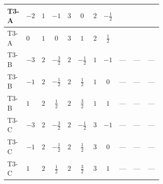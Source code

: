 \documentclass[8pt]{article}
\begin{document}
\begin{landscape}
\begin{longtable}{@{}llcccccc >{\raggedright\arraybackslash}p{0.21\linewidth} >{\raggedright\arraybackslash}p{0.21\linewidth} >{\raggedright\arraybackslash}p{0.21\linewidth}@{}}
\midrule
T3-A & $-2$ & $1$ & $-1$ & $3$ & $0$ & $2$ & $-\frac{1}{2}$ & \scriptsize\adjustbox{max width=\linewidth}{$\begin{gathered} {\lambda_5} (2 T_{\nu}^{(1)}+T_{\nu}^{(2)}+6 \operatorname{Tr}\!\left({Y_d}\,\left({Y_d}\right)^{\dagger}\right)+2 \operatorname{Tr}\!\left({Y_e}\,\left({Y_e}\right)^{\dagger}\right)+6 \operatorname{Tr}\!\left({Y_u}\,\left({Y_u}\right)^{\dagger}\right)+4 {\lambda_{HS_2}^{(A)}})\end{gathered}$} & \scriptsize\adjustbox{max width=\linewidth}{$\begin{gathered} -\frac{21 {g_2}^2 {\lambda_5}}{2}\end{gathered}$} & \scriptsize\adjustbox{max width=\linewidth}{$\begin{gathered} -\frac{9 {g_1}^2 {\lambda_5}}{2}\end{gathered}$} \\
\midrule
T3-A & $0$ & $1$ & $0$ & $3$ & $1$ & $2$ & $\frac{1}{2}$ & \scriptsize\adjustbox{max width=\linewidth}{$\begin{gathered} {\lambda_5} (2 T_{\nu}^{(1)}+T_{\nu}^{(2)}+6 \operatorname{Tr}\!\left({Y_d}\,\left({Y_d}\right)^{\dagger}\right)+2 \operatorname{Tr}\!\left({Y_e}\,\left({Y_e}\right)^{\dagger}\right)+6 \operatorname{Tr}\!\left({Y_u}\,\left({Y_u}\right)^{\dagger}\right)+4 {\lambda_{HS_2}^{(A)}})\end{gathered}$} & \scriptsize\adjustbox{max width=\linewidth}{$\begin{gathered} -\frac{21 {g_2}^2 {\lambda_5}}{2}\end{gathered}$} & \scriptsize\adjustbox{max width=\linewidth}{$\begin{gathered} -\frac{9 {g_1}^2 {\lambda_5}}{2}\end{gathered}$} \\
\midrule
T3-B & $-3$ & $2$ & $-\frac{3}{2}$ & $2$ & $-\frac{1}{2}$ & $1$ & $-1$ & --- & --- & --- \\
\midrule
T3-B & $-1$ & $2$ & $-\frac{1}{2}$ & $2$ & $\frac{1}{2}$ & $1$ & $0$ & --- & --- & --- \\
\midrule
T3-B & $1$ & $2$ & $\frac{1}{2}$ & $2$ & $\frac{3}{2}$ & $1$ & $1$ & --- & --- & --- \\
\midrule
T3-C & $-3$ & $2$ & $-\frac{3}{2}$ & $2$ & $-\frac{1}{2}$ & $3$ & $-1$ & --- & --- & --- \\
\midrule
T3-C & $-1$ & $2$ & $-\frac{1}{2}$ & $2$ & $\frac{1}{2}$ & $3$ & $0$ & --- & --- & --- \\
\midrule
T3-C & $1$ & $2$ & $\frac{1}{2}$ & $2$ & $\frac{3}{2}$ & $3$ & $1$ & --- & --- & --- \\

\end{longtable}
\end{landscape}
\end{document}
